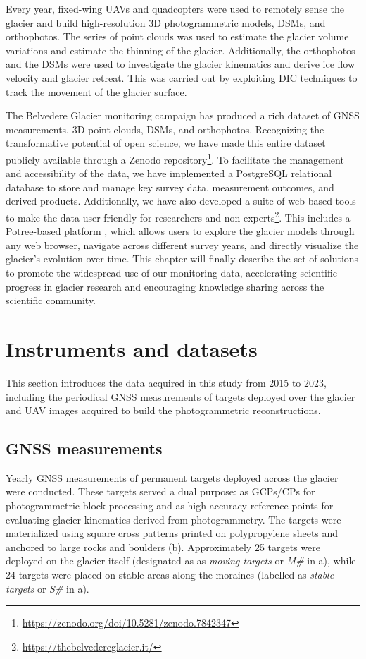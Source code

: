 Every year, fixed-wing UAVs and quadcopters were used to remotely sense the glacier and build high-resolution 3D photogrammetric models, DSMs, and orthophotos.
The series of point clouds was used to estimate the glacier volume variations and estimate the thinning of the glacier.
Additionally, the orthophotos and the DSMs were used to investigate the glacier kinematics and derive ice flow velocity and glacier retreat. 
This was carried out by exploiting DIC techniques to track the movement of the glacier surface.

The Belvedere Glacier monitoring campaign has produced a rich dataset of GNSS measurements, 3D point clouds, DSMs, and orthophotos. 
Recognizing the transformative potential of open science, we have made this entire dataset publicly available through a Zenodo repository\footnote{\url{https://zenodo.org/doi/10.5281/zenodo.7842347}}.
To facilitate the management and accessibility of the data, we have implemented a PostgreSQL relational database to store and manage key survey data, measurement outcomes, and derived products. 
Additionally, we have also developed a suite of web-based tools to make the data user-friendly for researchers and non-experts\footnote{\url{https://thebelvedereglacier.it/}}.
This includes a Potree-based platform \citep{schutz2016potree}, which allows users to explore the glacier models through any web browser, navigate across different survey years, and directly visualize the glacier's evolution over time.
This chapter will finally describe the set of solutions to promote the widespread use of our monitoring data, accelerating scientific progress in glacier research and encouraging knowledge sharing across the scientific community.

\section{Instruments and datasets}\label{sec:3:instrument}
 
This section introduces the data acquired in this study from 2015 to 2023, including the periodical GNSS measurements of targets deployed over the glacier and UAV images acquired to build the photogrammetric reconstructions.

\subsection{GNSS measurements}\label{sec:3:gnss}

Yearly GNSS measurements of permanent targets deployed across the glacier were conducted. 
These targets served a dual purpose: as GCPs/CPs for photogrammetric block processing and as high-accuracy 
reference points for evaluating glacier kinematics derived from photogrammetry. 
The targets were materialized using square cross patterns printed on polypropylene sheets and anchored to 
large rocks and boulders (b).
Approximately 25 targets were deployed on the glacier itself (designated as as \textit{moving targets} or 
\textit{M\#} in a), while 24 targets were placed on stable areas along the moraines 
(labelled as \textit{stable targets} or \textit{S\#} in a). 


